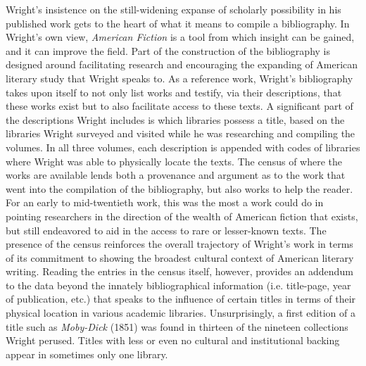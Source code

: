 Wright's insistence on the still-widening expanse of scholarly possibility in his published work gets to the heart of what it means to compile a bibliography. In Wright's own view, \textit{American Fiction} is a tool from which insight can be gained, and it can improve the field. Part of the construction of the bibliography is designed around facilitating research and encouraging the expanding of American literary study that Wright speaks to. As a reference work, Wright's bibliography takes upon itself to not only list works and testify, via their descriptions, that these works exist but to also facilitate access to these texts. A significant part of the descriptions Wright includes is which libraries possess a title, based on the libraries Wright surveyed and visited while he was researching and compiling the volumes. In all three volumes, each description is appended with codes of libraries where Wright was able to physically locate the texts. The census of where the works are available lends both a provenance and argument as to the work that went into the compilation of the bibliography, but also works to help the reader. For an early to mid-twentieth work, this was the most a work could do in pointing researchers in the direction of the wealth of American fiction that exists, but still endeavored to aid in the access to rare or lesser-known texts. The presence of the census reinforces the overall trajectory of Wright's work in terms of its commitment to showing the broadest cultural context of American literary writing. Reading the entries in the census itself, however, provides an addendum to the data beyond the innately bibliographical information (i.e. title-page, year of publication, etc.) that speaks to the influence of certain titles in terms of their physical location in various academic libraries. Unsurprisingly, a first edition of a title such as \textit{Moby-Dick} (1851) was found in thirteen of the nineteen collections Wright perused. Titles with less or even no cultural and institutional backing appear in sometimes only one library. 

